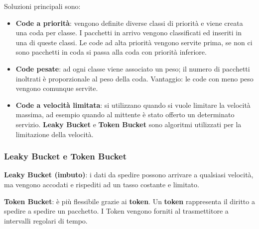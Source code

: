                 Soluzioni principali sono:
                \begin{itemize}
                    \item \textbf{Code a priorità}: vengono definite diverse classi di priorità e viene creata una coda per classe. I pacchetti in arrivo vengono classificati ed inseriti in una di queste classi. Le code ad alta priorità vengono servite prima, se non ci sono pacchetti in coda si passa alla coda con priorità inferiore.
                    \item \textbf{Code pesate}: ad ogni classe viene associato un peso; il numero di pacchetti inoltrati è proporzionale al peso della coda. Vantaggio: le code con meno peso vengono comunque servite.
                    \item \textbf{Code a velocità limitata}: si utilizzano quando si vuole limitare la velocità massima, ad esempio quando al mittente è stato offerto un determinato servizio. \textbf{Leaky Bucket} e \textbf{Token Bucket} sono algoritmi utilizzati per la limitazione della velocità.
                \end{itemize}
            
            \subsubsection{Leaky Bucket e Token Bucket}
                \textbf{Leaky Bucket (imbuto)}: i dati da spedire possono arrivare a qualsiasi velocità, ma vengono accodati e rispediti ad un tasso costante e limitato.
            
                \textbf{Token Bucket}: è più flessibile grazie ai \textbf{token}. Un \textbf{token} rappresenta il diritto a spedire a spedire un pacchetto. I Token vengono forniti al trasmettitore a intervalli regolari di tempo.